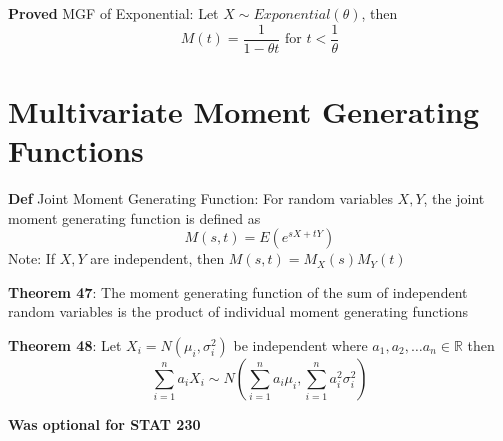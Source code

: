\documentclass[11pt,notitlepage]{report}
\begin{document}
\textbf{Proved} MGF of Exponential: Let $X \sim Exponential(\theta)$, then
$$M(t) = \frac{1}{1-\theta t} \text{ for } t < \frac{1}{\theta}$$

\newpage


\section{Multivariate Moment Generating Functions}

\textbf{Def} Joint Moment Generating Function: For random variables $X, Y$, the joint moment generating function is defined as
$$M(s, t) = E(e^{sX+tY})$$
\hspace*{5mm} Note: If $X, Y$ are independent, then $M(s, t) = M_X(s)M_Y(t)$

\textbf{Theorem 47}: The moment generating function of the sum of independent random variables is the product of individual moment generating functions

\textbf{Theorem 48}: Let $X_i = N(\mu_i, \sigma_i^2)$ be independent where $a_1, a_2, \dots a_n \in \mathbb R$ then
$$\sum_{i=1}^n a_iX_i \sim N\left(\sum_{i=1}^n a_i \mu_i, \sum_{i=1}^n a_i^2 \sigma_i^2\right)$$

\textbf{Was optional for STAT 230}
\end{document}

